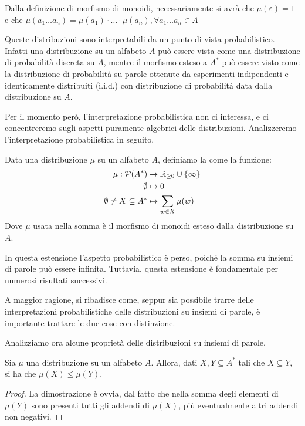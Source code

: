 Dalla definizione di morfismo di monoidi, necessariamente si avrà che \(\mu(\varepsilon) = 1\) e che \(\mu(a_1\ldots a_n) = \mu(a_1)\cdot\ldots\cdot \mu(a_n), \forall a_1\ldots a_n \in A\)

\begin{note}
  Queste distribuzioni sono interpretabili da un punto di vista probabilistico.
  Infatti una distribuzione su un alfabeto \(A\) può essere vista come una distribuzione di probabilità discreta su \(A\),
  mentre il morfismo esteso a \(A^*\) può essere visto come la distribuzione di probabilità su parole ottenute da esperimenti indipendenti e identicamente distribuiti (i.i.d.) con distribuzione di probabilità data dalla distribuzione su \(A\).
  
  Per il momento però, l'interpretazione probabilistica non ci interessa, e ci concentreremo sugli aspetti puramente algebrici delle distribuzioni.
  Analizzeremo l'interpretazione probabilistica in seguito.
\end{note}

\begin{definition}
  Data una distribuzione \(\mu\) su un alfabeto \(A\), definiamo la  come la funzione:
  \begin{equation*}
    \begin{aligned}
      \mu: \mathcal{P}(A^*) &\to \R_{\geq 0} \cup \set{\infty} \\
                  \emptyset &\mapsto 0 \\
                 \emptyset \neq X \subseteq A^* &\mapsto \sum_{w \in X} \mu(w)
    \end{aligned}
  \end{equation*}
  Dove \(\mu\) usata nella somma è il morfismo di monoidi esteso dalla distribuzione su \(A\).  
\end{definition}

\begin{note}
  In questa estensione l'aspetto probabilistico è perso, poiché la somma su insiemi di parole può essere infinita.
  Tuttavia, questa estensione è fondamentale per numerosi risultati successivi.

  A maggior ragione, si ribadisce come, seppur sia possibile trarre delle interpretazioni probabilistiche delle distribuzioni su insiemi di parole, è importante trattare le due cose con distinzione.
\end{note}

Analizziamo ora alcune proprietà delle distribuzioni su insiemi di parole.
\begin{proposition}\label{prop:distribution_monotonicity}
  Sia \(\mu\) una distribuzione su un alfabeto \(A\).
  Allora, dati \(X,Y \subseteq A^*\) tali che \(X \subseteq Y\), si ha che \(\mu(X) \leq \mu(Y)\).
\end{proposition}
\begin{proof}
  La dimostrazione è ovvia, dal fatto che nella somma degli elementi di \(\mu(Y)\) sono presenti tutti gli addendi di \(\mu(X)\), più eventualmente altri addendi non negativi.
\end{proof}

